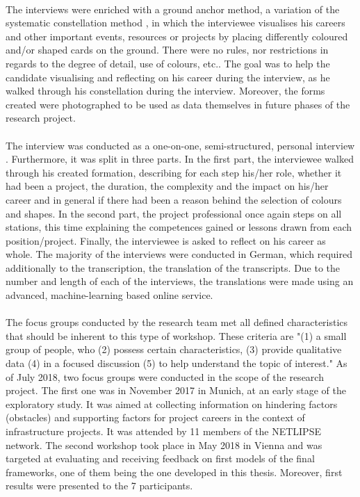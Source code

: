 \\[.1cm]
The interviews were enriched with a ground anchor method, a variation of the systematic constellation method \cite{huemann16}, in which the interviewee visualises his careers and other important events, resources or projects by placing differently coloured and/or shaped cards on the ground. There were no rules, nor restrictions in regards to the degree of detail, use of colours, etc.. The goal was to help the candidate visualising and reflecting on his career during the interview, as he walked through his constellation during the interview. Moreover, the forms created were photographed to be used as data themselves in future phases of the research project. \\

\\[.1cm]
The interview was conducted as a one-on-one, semi-structured, personal interview \cite{maylor17}. Furthermore, it was split in three parts. In the first part, the interviewee walked through his created formation, describing for each step his/her role, whether it had been a project, the duration, the complexity and the impact on his/her career and in general if there had been a reason behind the selection of colours and shapes. In the second part, the project professional once again steps on all stations, this time explaining the competences gained or lessons drawn from each position/project. Finally, the interviewee is asked to reflect on his career as whole. The majority of the interviews were conducted in German, which required additionally to the transcription, the translation of the transcripts. Due to the number and length of each of the interviews, the translations were made using an advanced, machine-learning based online service.\\


\\[.1cm]
The focus groups conducted by the research team met all defined characteristics that should be inherent to this type of workshop. These criteria are "(1) a small group of people, who (2) possess certain characteristics, (3) provide qualitative data (4) in a focused discussion (5) to help understand the topic of interest."\cite{krueger14}
As of July 2018, two focus groups were conducted in the scope of the research project. The first one was in November 2017 in Munich, at an early stage of the exploratory study. It was aimed at collecting information on hindering factors (obstacles) and supporting factors for project careers in the context of infrastructure projects. It was attended by 11 members of the NETLIPSE network. The second workshop took place in May 2018 in Vienna and was targeted at evaluating and receiving feedback on first models of the final frameworks, one of them being the one developed in this thesis. Moreover, first results were presented to the 7 participants. \\

